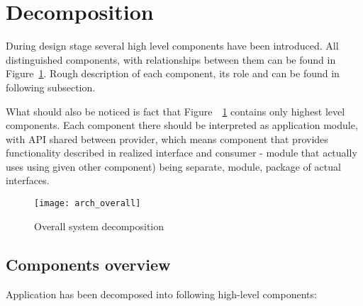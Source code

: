 %


\section{Decomposition}
\label{sec:ch5_decomposition}

During design stage several high level components have been introduced. All distinguished components, with
relationships between them can be found in Figure~\ref{fig:arch_overall}. Rough description of each component, its role
and can be found in following subsection. 

What should also be noticed is fact that Figure~~\ref{fig:arch_overall} contains only highest level components. Each
component there should be interpreted as application module, with API shared between provider, which means component
that  provides functionality described in realized interface and consumer - module that actually uses using given other
component) being separate, module, package of actual interfaces.




\begin{figure}[h]
  \centering
  \texttt{[image: arch\_overall]}
  \caption{Overall system decomposition}
  \label{fig:arch_overall}
\end{figure}

\subsection{Components overview}

Application has been decomposed into following high-level components:

